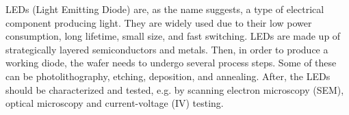 
LEDs (Light Emitting Diode) are, as the name suggests, a type of electrical component producing light. 
They are widely used due to their low power consumption, long lifetime, small size, and fast switching.
LEDs are made up of strategically layered semiconductors and metals.
Then, in order to produce a working diode, the wafer needs to undergo several process steps.
Some of these can be photolithography, etching, deposition, and annealing.
After, the LEDs should be characterized and tested, e.g. by scanning electron microscopy (SEM), optical microscopy and current-voltage (IV) testing.



